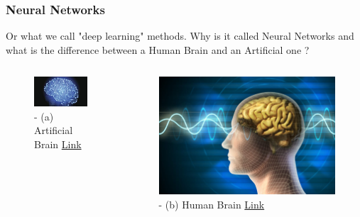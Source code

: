 \documentclass{beamer}
\begin{document}
\begin{frame}
\frametitle{Neural Networks}
Or what we call "deep learning" methods.
Why is it called Neural Networks and what is the difference between a Human Brain and an Artificial one ?
\begin{columns}
\centering
\begin{figure}
\includegraphics[scale=0.55]{artificial_brain.jpeg}
\caption{ - (a) Artificial Brain \href{https://www.thedailybeast.com/the-science-communitys-fight-over-an-artificial-brain}{Link}}
\end{figure}
\centering
\begin{figure}
\includegraphics[scale=0.14]{humain_brain.jpg}
\caption{ - (b) Human Brain \href{https://www.pymnts.com/innovation/2019/elon-musk-human-brain-connected-device/}{Link}}
\end{figure}
\end{columns}
\end{frame}
\end{document}
